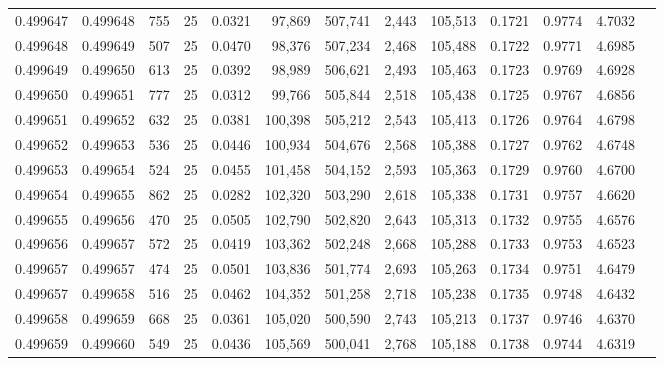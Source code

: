 \begin{tabular}{rrrrrrrrrrrrr}
0.499647 & 0.499648 &   755 &  25 &                                     0.0321 &  97,869 & 507,741 &   2,443 & 105,513 & 0.1721 & 0.9774 & 4.7032 \\
0.499648 & 0.499649 &   507 &  25 &                                     0.0470 &  98,376 & 507,234 &   2,468 & 105,488 & 0.1722 & 0.9771 & 4.6985 \\
0.499649 & 0.499650 &   613 &  25 &                                     0.0392 &  98,989 & 506,621 &   2,493 & 105,463 & 0.1723 & 0.9769 & 4.6928 \\
0.499650 & 0.499651 &   777 &  25 &                                     0.0312 &  99,766 & 505,844 &   2,518 & 105,438 & 0.1725 & 0.9767 & 4.6856 \\
0.499651 & 0.499652 &   632 &  25 &                                     0.0381 & 100,398 & 505,212 &   2,543 & 105,413 & 0.1726 & 0.9764 & 4.6798 \\
0.499652 & 0.499653 &   536 &  25 &                                     0.0446 & 100,934 & 504,676 &   2,568 & 105,388 & 0.1727 & 0.9762 & 4.6748 \\
0.499653 & 0.499654 &   524 &  25 &                                     0.0455 & 101,458 & 504,152 &   2,593 & 105,363 & 0.1729 & 0.9760 & 4.6700 \\
0.499654 & 0.499655 &   862 &  25 &                                     0.0282 & 102,320 & 503,290 &   2,618 & 105,338 & 0.1731 & 0.9757 & 4.6620 \\
0.499655 & 0.499656 &   470 &  25 &                                     0.0505 & 102,790 & 502,820 &   2,643 & 105,313 & 0.1732 & 0.9755 & 4.6576 \\
0.499656 & 0.499657 &   572 &  25 &                                     0.0419 & 103,362 & 502,248 &   2,668 & 105,288 & 0.1733 & 0.9753 & 4.6523 \\
0.499657 & 0.499657 &   474 &  25 &                                     0.0501 & 103,836 & 501,774 &   2,693 & 105,263 & 0.1734 & 0.9751 & 4.6479 \\
0.499657 & 0.499658 &   516 &  25 &                                     0.0462 & 104,352 & 501,258 &   2,718 & 105,238 & 0.1735 & 0.9748 & 4.6432 \\
0.499658 & 0.499659 &   668 &  25 &                                     0.0361 & 105,020 & 500,590 &   2,743 & 105,213 & 0.1737 & 0.9746 & 4.6370 \\
0.499659 & 0.499660 &   549 &  25 &                                     0.0436 & 105,569 & 500,041 &   2,768 & 105,188 & 0.1738 & 0.9744 & 4.6319 \\

\end{tabular}

